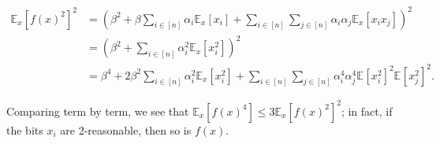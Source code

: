 \documentclass[12pt]{article}
\newcommand{\E}[2]{\mathbb E_{#1}\left[#2\right]}
\newcommand{\sumi}{\sum_{i \in [n]}}
\newcommand{\sumj}{\sum_{j \in [n]}}
\begin{document}
\begin{align*}
    \E{x}{f(x)^2}^2 &= \left(\beta^2 + \beta \sumi \alpha_i \E{x}{x_i} + \sumi \sumj \alpha_i \alpha_j \E{x}{x_i x_j}\right)^2\\
    &= \left(\beta^2 + \sumi \alpha_i^2 \E{x}{x_i^2}\right)^2\\
    &= \beta^4 + 2\beta^2 \sumi \alpha_i^2 \E{x}{x_i^2} + \sumi \sumj \alpha_i^4 \alpha_j^4 \E{}{x_i^2}^2 \E{}{x_j^2}^2.
\end{align*}

Comparing term by term, we see that $\E{x}{f(x)^4} \leq 3 \E{x}{f(x)^2}^2$; in fact, if the bits $x_i$ are 2-reasonable, then so is $f(x)$.

\subsection{}
\end{document}
